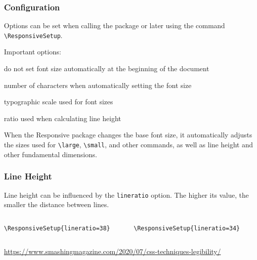 \begin{frame}[fragile]
  \frametitle{Configuration}
  Options can be set when calling the package or later using the command \verb|\ResponsiveSetup|.

  Important options:

  \begin{description}[noautomatic]
    \item[noautomatic] do not set font size automatically at the beginning of the document
    \item[characters] number of characters when automatically setting the font size
    \item[scale] typographic scale used for font sizes
    \item[lineratio] ratio used when calculating line height
  \end{description}

\end{frame}

When the Responsive package changes the base font size, it automatically
adjusts the sizes used for \verb|\large|, \verb|\small|, and other commands, as well as line
height and other fundamental dimensions.


\begin{frame}[fragile]
  \frametitle{Line Height}
  Line height can be influenced by the \texttt{lineratio} option. 
The higher its value, the smaller the distance between lines.

\begin{columns}
  \begin{column}{0.5\textwidth}
\begin{verbatim}
\ResponsiveSetup{lineratio=38}
\end{verbatim}

\end{column}
  \begin{column}{0.5\textwidth}
\begin{verbatim}
\ResponsiveSetup{lineratio=34}
\end{verbatim}

\end{column}
\end{columns}

\url{https://www.smashingmagazine.com/2020/07/css-techniques-legibility/}

\end{frame}

